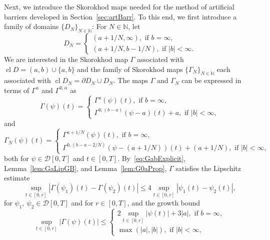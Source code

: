 \documentclass[11pt]{amsart}
\newcommand{\DDN}{D_{N}}
\newcommand{\CDD}{\operatorname{cl} D}
\newcommand{\CDDN}{\operatorname{cl} D_{N}}
\begin{document}
{Next, we introduce the Skorokhod maps needed for the method of artificial barriers developed in Section~\ref{sec:artBarr}. To this end, we first introduce a family of domains $\{ \DDN \}_{N \in \mathbb{N}}$: For $N \in \mathbb{N}$, let
\begin{equation*}
\DDN=
\begin{cases}
(a + 1/N, \infty), \text{ if } b = \infty,\\
(a + 1/N, b - 1/N), \text{ if } |b| < \infty.
\end{cases}
\end{equation*}
We are interested in the Skorokhod map $\Gamma$ associated with $\CDD = (a,b) \cup \{ a,b \}$ and the family of Skorokhod maps $\{ \Gamma_{N} \}_{N \in \mathbb{N}}$ each associated with $\CDDN = \partial \DDN \cup \DDN$. The maps $\Gamma$ and $\Gamma_{N}$ can be expressed in terms of $\Gamma^{\alpha}$ and $\Gamma^{0,\alpha}$ as
\begin{equation}\label{eq:GabExplicit}
\Gamma(\psi)(t)=
\begin{cases}
\Gamma^{a}(\psi)(t), \text{ if } b = \infty,\\
\Gamma^{0,(b-a)}(\psi - a)(t) + a, \text{ if } |b| < \infty,
\end{cases}
\end{equation}
and
\begin{equation}\label{eq:GNexplicit}
\Gamma_{N}(\psi)(t)=
\begin{cases}
\Gamma^{a + 1/N}(\psi)(t), \text{ if } b = \infty,\\
\Gamma^{0,(b-a-2/N)}\left(\psi - (a + 1/N) \right)(t) + (a + 1/N), \text{ if } |b| < \infty,
\end{cases}
\end{equation}
both for $\psi \in \mathcal{D}[0,T]$ and $t \in [0,T]$. By~\eqref{eq:GabExplicit}, Lemma~\ref{lem:GaLipGB}, and Lemma~\ref{lem:G0aProp}, $\Gamma$ satisfies the Lipschitz estimate 
\begin{equation*}
\sup_{t \in [0,r]} |\Gamma(\psi_{1})(t)-\Gamma(\psi_{2})(t)| \leq 4 \sup_{t \in [0,r]} |\psi_{1}(t)-\psi_{2}(t)|,
\end{equation*}
for $\psi_{1},\ \psi_{2} \in \mathcal{D}[0,T]$ and for $r \in [0,T]$, and the growth bound
\begin{equation*}
\sup_{t \in [0,r]} |\Gamma(\psi)(t)| \leq
\begin{cases}
2 \sup_{t \in [0,r]} |\psi(t)| + 3 |a|, \text{ if } b = \infty,\\
\max(|a|,|b|), \text{ if } |b| < \infty,
\end{cases}

\end{equation*}}
\end{document}
